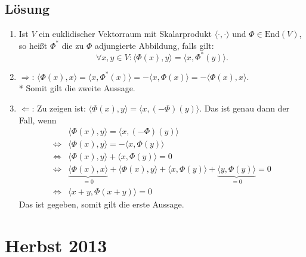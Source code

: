 \subsection{Lösung}
\begin{enumerate}
	\item Ist \( V \) ein euklidischer Vektorraum mit Skalarprodukt \( \langle \cdot, \cdot \rangle \) und \( \Phi \in \text{End}(V) \), so heißt \( \Phi^\ast \) die zu \( \Phi \) adjungierte Abbildung, falls gilt:
		\begin{equation*}
		 	\forall x,y \in V : \langle \Phi(x),y \rangle = \langle x, \Phi^\ast(y) \rangle\text{.}
		 \end{equation*}
	\item \underline{\( \Rightarrow \)}: \( \langle \Phi(x),x \rangle = \langle x, \Phi^\ast(x) \rangle = - \langle x, \Phi(x) \rangle = - \langle \Phi(x),x \rangle \).
		\\*
		Somit gilt die zweite Aussage.
	\item \underline{\( \Leftarrow \)}: Zu zeigen ist: \( \langle \Phi(x), y \rangle = \langle x, (-\Phi)(y) \rangle \). Das ist genau dann der Fall, wenn
		\begin{align*}
			&\langle \Phi(x),y \rangle = \langle x, (-\Phi)(y) \rangle \\
			\Leftrightarrow &\langle \Phi(x),y \rangle = - \langle x, \Phi(y) \rangle \\
			\Leftrightarrow &\langle \Phi(x),y \rangle + \langle x, \Phi(y) \rangle = 0 \\
			\Leftrightarrow &\underbrace{\langle \Phi(x),x \rangle}_{=0} + \langle \Phi(x),y \rangle + \langle x, \Phi(y) \rangle + \underbrace{\langle y, \Phi(y) \rangle}_{=0} = 0 \\
			\Leftrightarrow &\langle x+y, \Phi(x+y) \rangle = 0
		\end{align*}
		Das ist gegeben, somit gilt die erste Aussage.
\end{enumerate}

\newpage

\section{Herbst 2013}

